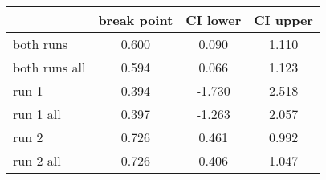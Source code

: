 \documentclass{article}
\begin{document}
\begin{table}[ht]
\centering
\begin{tabular}{lccc}
  \hline
 & break point & CI lower & CI upper \\ 
  \hline
both runs & 0.600 & 0.090 & 1.110 \\ 
  both runs all & 0.594 & 0.066 & 1.123 \\ 
  run 1 & 0.394 & -1.730 & 2.518 \\ 
  run 1 all & 0.397 & -1.263 & 2.057 \\ 
  run 2 & 0.726 & 0.461 & 0.992 \\ 
  run 2 all & 0.726 & 0.406 & 1.047 \\ 
   \hline
\end{tabular}
\end{table}
\end{document}
